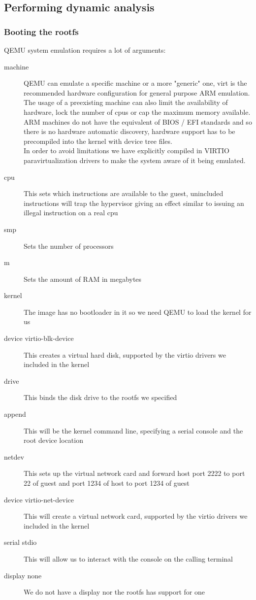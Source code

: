 \subsection{Performing dynamic analysis}
\begin{frame}[fragile]
  \frametitle{Booting the rootfs}
  \footnotesize
  
\end{frame}
 {
  QEMU system emulation requires a lot of arguments:
  \begin{description}
    \item[machine] QEMU can emulate a specific machine or a more "generic" one,
      virt is the recommended hardware configuration for general purpose ARM emulation. \\
      The usage of a preexisting machine can also limit the availability of hardware, lock the number of cpus or cap the maximum memory available. \\
      ARM machines do not have the equivalent of BIOS / EFI standards and so there is no hardware automatic discovery, hardware support has to be precompiled into the kernel with device tree files. \\
      In order to avoid limitations we have explicitly compiled in VIRTIO paravirtualization drivers to make the system aware of it being emulated.
    \item[cpu] This sets which instructions are available to the guest,
      unincluded instructions will trap the hypervisor giving an effect similar to issuing an illegal instruction on a real cpu
    \item[smp] Sets the number of processors
    \item[m] Sets the amount of RAM in megabytes
    \item[kernel] The image has no bootloader in it so we need QEMU to load the kernel for us
    \item[device virtio-blk-device] This creates a virtual hard disk, supported by the virtio drivers we included in the kernel
    \item[drive] This binds the disk drive to the rootfs we specified
    \item[append] This will be the kernel command line, specifying a serial console and the root device location
    \item[netdev] This sets up the virtual network card and forward host port 2222 to port 22 of guest and port 1234 of host to port 1234 of guest
    \item[device virtio-net-device] This will create a virtual network card, supported by the virtio drivers we included in the kernel
    \item[serial stdio] This will allow us to interact with the console on the calling terminal
    \item[display none] We do not have a display nor the rootfs has support for one
  \end{description}
}

